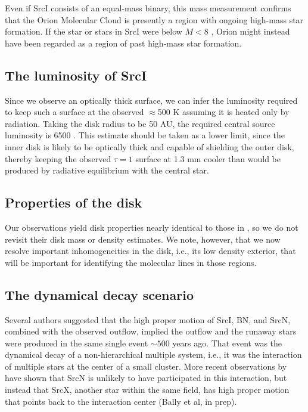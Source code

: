 \documentclass[twocolumn]{aastex61}
\newcommand{\sourcei}{SrcI\xspace}
\newcommand{\sourcen}{SrcN\xspace}
\newcommand{\sourcex}{SrcX\xspace}
\begin{document}
Even if \sourcei consists of an equal-mass binary, this mass measurement
confirms that the Orion Molecular Cloud is presently a region with ongoing
high-mass star formation.  If the star or stars in \sourcei were below $M<8$
\msun, Orion might instead have been regarded as a region of past high-mass
star formation.

\subsection{The luminosity of \sourcei}
Since we observe an optically thick surface, we can infer the luminosity
required to keep such a surface at the observed $\approx$500 K assuming
it is heated only by radiation.  Taking the disk radius to be 50 AU,
the required central source luminosity is 6500 \lsun.  This estimate
should be taken as a lower limit, since the inner disk is likely to be
optically thick and capable of shielding the outer disk, thereby
keeping the observed $\tau=1$ surface at 1.3 mm cooler than would
be produced by radiative equilibrium with the central star.

\subsection{Properties of the disk}
Our observations yield disk properties nearly identical to those in
\citet{Plambeck2016a}, so we do not revisit their disk mass or density
estimates.  We note, however, that we now resolve important inhomogeneities in
the disk, i.e., its low density exterior, that will be important for
identifying the molecular lines in those regions.

\subsection{The dynamical decay scenario}
Several authors \citep[][]{Gomez2008a,Goddi2011b,Bally2011a} suggested that
the high proper
motion of \sourcei, BN, and \sourcen, combined with the observed \hh outflow,
implied the outflow and the runaway stars were produced in the same single
event $\sim500$ years ago.  That event was the dynamical decay of a
non-hierarchical multiple system, i.e., it was the interaction of multiple
stars at the center of a small cluster.  More recent observations by
\citet{Luhman2017a} have shown that \sourcen is unlikely to have participated
in this interaction, but instead that \sourcex, another star within the same
field, has high proper motion that points back to the interaction center (Bally et al,
in prep).
\end{document}
